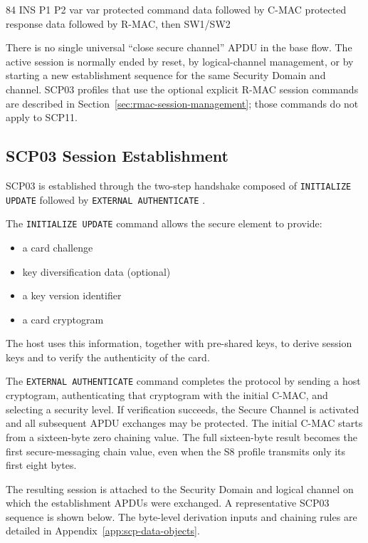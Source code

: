 \apdudesc
{84}
{INS}
{P1}
{P2}
{var}
{var}
{protected command data followed by C-MAC}
{protected response data followed by R-MAC, then SW1/SW2}

There is no single universal ``close secure channel'' APDU in the base flow.
The active session is normally ended by reset, by logical-channel management,
or by starting a new establishment sequence for the same Security Domain and
channel. SCP03 profiles that use the optional explicit R-MAC session commands
are described in Section~\ref{sec:rmac-session-management}; those commands do
not apply to SCP11.

\subsection{SCP03 Session Establishment}

SCP03 is established through the two-step handshake composed of
\texttt{INITIALIZE UPDATE} followed by \texttt{EXTERNAL AUTHENTICATE}
.

The \texttt{INITIALIZE UPDATE} command allows the secure element to provide:
\begin{itemize}
\item a card challenge
\item key diversification data (optional)
\item a key version identifier
\item a card cryptogram
\end{itemize}

The host uses this information, together with pre-shared keys, to derive
session keys and to verify the authenticity of the card.

The \texttt{EXTERNAL AUTHENTICATE} command completes the protocol by sending a
host cryptogram, authenticating that cryptogram with the initial C-MAC, and
selecting a security level. If verification succeeds, the Secure Channel is
activated and all subsequent APDU exchanges may be protected. The initial
C-MAC starts from a sixteen-byte zero chaining value. The full sixteen-byte
result becomes the first secure-messaging chain value, even when the S8 profile
transmits only its first eight bytes.

The resulting session is attached to the Security Domain and logical channel
on which the establishment APDUs were exchanged. A representative SCP03
sequence is shown below. The byte-level derivation inputs and chaining rules
are detailed in Appendix~\ref{app:scp-data-objects}.

